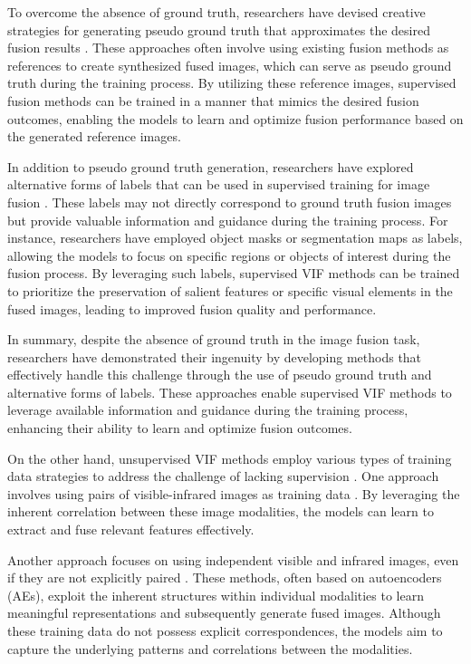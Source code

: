 To overcome the absence of ground truth, researchers have devised creative strategies for generating pseudo ground truth that approximates the desired fusion results \cite{pupground}. These approaches often involve using existing fusion methods as references to create synthesized fused images, which can serve as pseudo ground truth during the training process. By utilizing these reference images, supervised fusion methods can be trained in a manner that mimics the desired fusion outcomes, enabling the models to learn and optimize fusion performance based on the generated reference images.

In addition to pseudo ground truth generation, researchers have explored alternative forms of labels that can be used in supervised training for image fusion \cite{altlabels}. These labels may not directly correspond to ground truth fusion images but provide valuable information and guidance during the training process. For instance, researchers have employed object masks or segmentation maps as labels, allowing the models to focus on specific regions or objects of interest during the fusion process. By leveraging such labels, supervised VIF methods can be trained to prioritize the preservation of salient features or specific visual elements in the fused images, leading to improved fusion quality and performance.

In summary, despite the absence of ground truth in the image fusion task, researchers have demonstrated their ingenuity by developing methods that effectively handle this challenge through the use of pseudo ground truth and alternative forms of labels. These approaches enable supervised VIF methods to leverage available information and guidance during the training process, enhancing their ability to learn and optimize fusion outcomes.

On the other hand, unsupervised VIF methods employ various types of training data strategies to address the challenge of lacking supervision \cite{unsupdata}. One approach involves using pairs of visible-infrared images as training data \cite{rao2023tgfuse, xu2021classification, song2022triple}. By leveraging the inherent correlation between these image modalities, the models can learn to extract and fuse relevant features effectively.

Another approach focuses on using independent visible and infrared images, even if they are not explicitly paired \cite{jian2020sedrfuse, patel2020approach, fu2021dual, zhao2021efficient}. These methods, often based on autoencoders (AEs), exploit the inherent structures within individual modalities to learn meaningful representations and subsequently generate fused images. Although these training data do not possess explicit correspondences, the models aim to capture the underlying patterns and correlations between the modalities.

